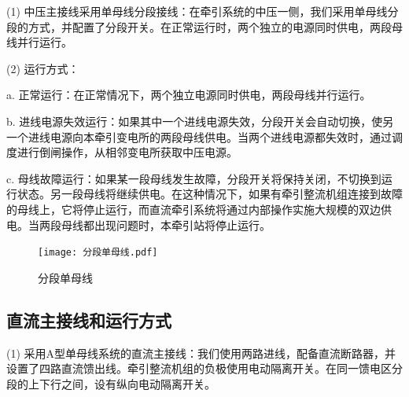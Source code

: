 (1) 中压主接线采用单母线分段接线：在牵引系统的中压一侧，我们采用单母线分段的方式，并配置了分段开关。在正常运行时，两个独立的电源同时供电，两段母线并行运行。\par 

(2) 运行方式：\par
a. 正常运行：在正常情况下，两个独立电源同时供电，两段母线并行运行。\par
b. 进线电源失效运行：如果其中一个进线电源失效，分段开关会自动切换，使另一个进线电源向本牵引变电所的两段母线供电。当两个进线电源都失效时，通过调度进行倒闸操作，从相邻变电所获取中压电源。\par
c. 母线故障运行：如果某一段母线发生故障，分段开关将保持关闭，不切换到运行状态。另一段母线将继续供电。在这种情况下，如果有牵引整流机组连接到故障的母线上，它将停止运行，而直流牵引系统将通过内部操作实施大规模的双边供电。当两段母线都出现问题时，本牵引站将停止运行。
\begin{figure}[!h]
	\centering
	\texttt{[image: 分段单母线.pdf]}
	\caption{分段单母线}
	
\end{figure}

\subsection{直流主接线和运行方式}

(1) 采用A型单母线系统的直流主接线：我们使用两路进线，配备直流断路器，并设置了四路直流馈出线。牵引整流机组的负极使用电动隔离开关。在同一馈电区分段的上下行之间，设有纵向电动隔离开关。\par 

